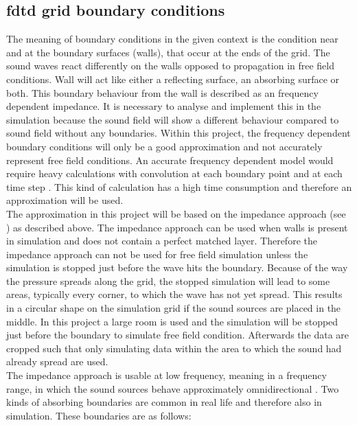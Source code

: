 \subsection{\gls{fdtd} grid boundary conditions}        
The meaning of boundary conditions in the given context is the condition near and at the boundary surfaces (walls), that occur at the ends of the grid. The sound waves react differently on the walls opposed to propagation in free field conditions. Wall will act like either a reflecting surface, an absorbing surface or both. This boundary behaviour from the wall is described as an frequency dependent impedance. It is necessary to analyse and implement this in the simulation because the sound field will show a different behaviour compared to sound field without any boundaries. Within this project, the frequency dependent boundary conditions will only be a good approximation and not accurately represent free field conditions. An accurate frequency dependent model would require heavy calculations with convolution at each boundary point and at each time step \citep{finiteproblems}. This kind of calculation has a high time consumption and therefore an approximation will be used. \\
The approximation in this project will be based on the impedance approach (see \citep{FDTDmodelling}) as described above. The impedance approach can be used when walls is present in simulation and does not contain a perfect matched layer. Therefore the impedance approach can not be used for free field simulation unless the simulation is stopped just before the wave hits the boundary. Because of the way the pressure spreads along the grid, the stopped simulation will lead to some areas, typically every corner, to which the wave has not yet spread. This results in a circular shape on the simulation grid if the sound sources are placed in the middle. In this project a large room is used and the simulation will be stopped just before the boundary to simulate free field condition. Afterwards the data are cropped such that only simulating data within the area to which the sound had already spread are used. \\

The  impedance approach is usable at low frequency, meaning in a frequency range, in which the sound sources behave approximately omnidirectional \citep{FDTDmodelling}. Two kinds of absorbing boundaries are common in real life and therefore also in simulation. These boundaries are as follows:

